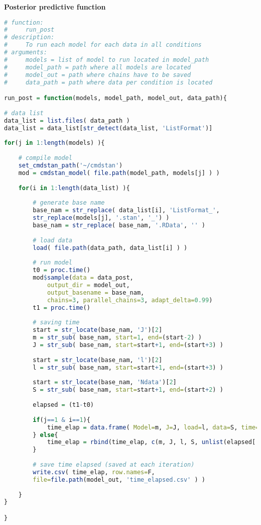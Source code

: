 \noindent \textbf{Posterior predictive function}
%
\begin{lstlisting}[language=R]
# function:
#     run_post
# description:  
#     To run each model for each data in all conditions
# arguments:
#     models = list of model to run located in model_path
#     model_path = path where all models are located
#     model_out = path where chains have to be saved
#     data_path = path where data per condition is located

run_post = function(models, model_path, model_out, data_path){
	
# data list
data_list = list.files( data_path )
data_list = data_list[str_detect(data_list, 'ListFormat')]
	
for(j in 1:length(models) ){
		
	# compile model
	set_cmdstan_path('~/cmdstan')
	mod = cmdstan_model( file.path(model_path, models[j] ) )
		
	for(i in 1:length(data_list) ){
			
		# generate base name
		base_nam = str_replace( data_list[i], 'ListFormat_', 
		str_replace(models[j], '.stan', '_') )
		base_nam = str_replace( base_nam, '.RData', '' )
			
		# load data
		load( file.path(data_path, data_list[i] ) )
			
		# run model
		t0 = proc.time()
		mod$sample(data = data_post, 
			output_dir = model_out, 
			output_basename = base_nam,
			chains=3, parallel_chains=3, adapt_delta=0.99)
		t1 = proc.time()
			
		# saving time
		start = str_locate(base_nam, 'J')[2]
		m = str_sub( base_nam, start=1, end=(start-2) )
		J = str_sub( base_nam, start=start+1, end=(start+3) )
			
		start = str_locate(base_nam, 'l')[2] 
		l = str_sub( base_nam, start=start+1, end=(start+3) )
		
		start = str_locate(base_nam, 'Ndata')[2]
		S = str_sub( base_nam, start=start+1, end=(start+2) )
		
		elapsed = (t1-t0)
			
		if(j==1 & i==1){
			time_elap = data.frame( Model=m, J=J, load=l, data=S, time=unlist(elapsed['elapsed']) )
		} else{
			time_elap = rbind(time_elap, c(m, J, l, S, unlist(elapsed['elapsed']) ) )
		}
			
		# save time elapsed (saved at each iteration)
		write.csv( time_elap, row.names=F, 
		file=file.path(model_out, 'time_elapsed.csv' ) )
			
	}
}

}
\end{lstlisting}